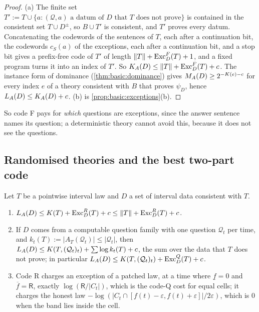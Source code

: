 \begin{proof}
(a) The finite set $T':=T\cup\{a:(\mathcal Q,a)\text{ a datum of $D$ that $T$ does not prove}\}$ is contained in the consistent set $T\cup D^\pm$, so $B\cup T'$ is consistent, and $T'$ proves every datum. Concatenating the codewords of the sentences of $T$, each after a continuation bit, the codewords $c_S(a)$ of the exceptions, each after a continuation bit, and a stop bit gives a prefix-free code of $T'$ of length $\lVert T\rVert+\mathrm{Exc}^F_D(T)+1$, and a fixed program turns it into an index of $T'$. So $K_{A}(D)\le\lVert T\rVert+\mathrm{Exc}^F_D(T)+c$. The instance form of dominance (\cref{thm:basic:dominance}) gives $M_{A}(D)\ge2^{-K(e)-c}$ for every index $e$ of a theory consistent with $B$ that proves $\psi_D$, hence $L_{A}(D)\le K_{A}(D)+c$. (b) is \cref{prop:basic:exceptions}(b).
\end{proof}

So code F pays for \emph{which} questions are exceptions, since the answer sentence names its question; a deterministic theory cannot avoid this, because it does not see the questions.

\subsection{Randomised theories and the best two-part code}\label{app:laws:random}

\begin{proposition}\label{prop:laws:randomised}
Let $T$ be a pointwise interval law and $D$ a set of interval data consistent with $T$.
\begin{enumerate}[label=(\alph*),itemsep=1pt,topsep=2pt]
\item $L_{A}(D)\le K(T)+\mathrm{Exc}^R_D(T)+c\le\lVert T\rVert+\mathrm{Exc}^R_D(T)+c$.
\item If $D$ comes from a computable question family with one question $\mathcal Q_t$ per time, and $k_t(T):=\lvert A_T(\mathcal Q_t)\rvert\le\lvert\mathcal Q_t\rvert$, then $L_{A}(D)\le K(T,(\mathcal Q_t)_t)+\sum\log k_t(T)+c$, the sum over the data that $T$ does not prove; in particular $L_{A}(D)\le K(T,(\mathcal Q_t)_t)+\mathrm{Exc}^Q_D(T)+c$.
\item Code R charges an exception of a patched law, at a time where $\underline f=0$ and $\overline f=\mathsf R$, exactly $\log(\mathsf R/\lvert C_t\rvert)$, which is the code-Q cost for equal cells; it charges the honest law $-\log(\lvert C_t\cap[f(t)-\varepsilon,f(t)+\varepsilon]\rvert/2\varepsilon)$, which is $0$ when the band lies inside the cell.
\end{enumerate}
\end{proposition}

